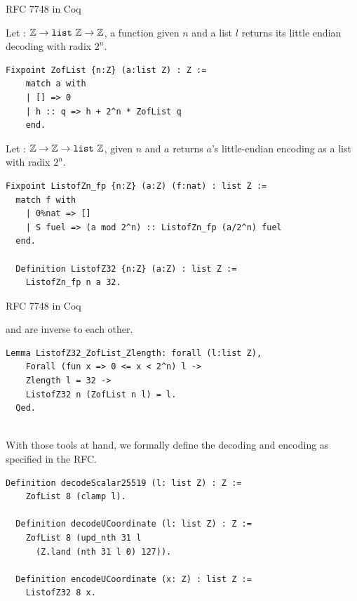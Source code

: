 \documentclass[8pt,aspectratio=169]{beamer}
\begin{document}
%
%
\begin{frame}[fragile]{RFC 7748 in Coq}
	\begin{informaltheorem}
		Let  : $\mathbb{Z} \rightarrow \texttt{list}~\mathbb{Z} \rightarrow \mathbb{Z}$,
		a function given $n$ and a list $l$ returns its little endian decoding with radix $2^n$.
	\end{informaltheorem}
	\begin{lstlisting}[language=Coq]
  Fixpoint ZofList {n:Z} (a:list Z) : Z :=
    match a with
    | [] => 0
    | h :: q => h + 2^n * ZofList q
    end.
  \end{lstlisting}

	\begin{informaltheorem}
		Let  : $\mathbb{Z} \rightarrow \mathbb{Z} \rightarrow \texttt{list}~\mathbb{Z}$, given
		$n$ and $a$ returns $a$'s little-endian encoding as a list with radix $2^n$.
	\end{informaltheorem}
	\begin{lstlisting}[language=Coq]
  Fixpoint ListofZn_fp {n:Z} (a:Z) (f:nat) : list Z :=
  match f with
    | 0%nat => []
    | S fuel => (a mod 2^n) :: ListofZn_fp (a/2^n) fuel
  end.

  Definition ListofZ32 {n:Z} (a:Z) : list Z :=
    ListofZn_fp n a 32.
  \end{lstlisting}
\end{frame}


%
%
\begin{frame}[fragile]{RFC 7748 in Coq}

	 and  are inverse to each other.
	\begin{lstlisting}[language=Coq]
  Lemma ListofZ32_ZofList_Zlength: forall (l:list Z),
    Forall (fun x => 0 <= x < 2^n) l ->
    Zlength l = 32 ->
    ListofZ32 n (ZofList n l) = l.
  Qed.
  \end{lstlisting}

	~\\

	With those tools at hand, we formally define the decoding and
	encoding as specified in the RFC.

	\begin{lstlisting}[language=Coq]
  Definition decodeScalar25519 (l: list Z) : Z :=
    ZofList 8 (clamp l).

  Definition decodeUCoordinate (l: list Z) : Z :=
    ZofList 8 (upd_nth 31 l
      (Z.land (nth 31 l 0) 127)).

  Definition encodeUCoordinate (x: Z) : list Z :=
    ListofZ32 8 x.
  \end{lstlisting}

\end{frame}
\end{document}
